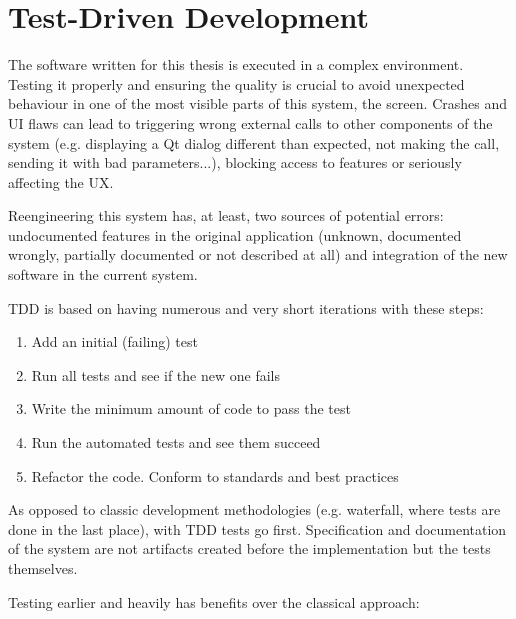 
\section{Test-Driven Development}
The software written for this thesis is executed in a complex environment.
Testing it properly and ensuring the quality is crucial to avoid unexpected behaviour in one of the most visible parts of this system, the screen.
Crashes and \ac{UI} flaws can lead to triggering wrong external calls to other components of the system (e.g. displaying a Qt dialog different than expected, not making the call, sending it with bad parameters...), blocking access to features or seriously affecting the \ac{UX}.

Reengineering this system has, at least, two sources of potential errors: 
undocumented features in the original application (unknown, documented wrongly, partially documented or not described at all) and integration of the new software in the current system.

\ac{TDD} is based on having numerous and very short iterations with these steps:
\begin{enumerate}
    \item Add an initial (failing) test
    \item Run all tests and see if the new one fails
    \item Write the minimum amount of code to pass the test
    \item Run the automated tests and see them succeed
    \item Refactor the code. Conform to standards and best practices
\end{enumerate}

As opposed to classic development methodologies (e.g. waterfall, where tests are done in the last place), with \ac{TDD} tests go first. 
Specification and documentation of the system are not artifacts created before the implementation but the tests themselves.

Testing earlier and heavily has benefits over the classical approach:

